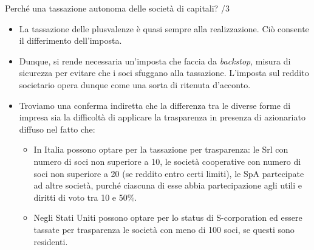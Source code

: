 \documentclass[aspectratio=64,11pt]{beamer}
\begin{document}
\begin{frame}{Perché una tassazione autonoma delle società di capitali? /3}
\begin{itemize}
\item La tassazione delle plusvalenze è quasi sempre alla realizzazione. Ciò
  consente il differimento dell'imposta.
\item Dunque, si rende necessaria un'imposta che faccia da \emph{backstop},
  misura di sicurezza per evitare che i soci sfuggano alla
  tassazione. L'imposta sul reddito societario opera dunque come una sorta di
  ritenuta d'acconto.
\end{itemize}
\bigskip

\begin{itemize}
\item Troviamo una conferma indiretta che la differenza tra le diverse forme
  di impresa sia la difficoltà di applicare la trasparenza in presenza di
  azionariato diffuso nel fatto che:
\begin{itemize}
\item In Italia possono optare per la tassazione per trasparenza: le Srl con
  numero di soci non superiore a 10, le società cooperative con numero di
  soci non superiore a 20 (se reddito entro certi limiti), le SpA partecipate
  ad altre società, purché ciascuna di esse abbia partecipazione agli utili e
  diritti di voto tra 10 e 50\%.
\item Negli Stati Uniti possono optare per lo status di S-corporation ed
  essere tassate per trasparenza le società con meno di 100 soci, se questi
  sono residenti.
\end{itemize}
\end{itemize}
\end{frame}
\end{document}
